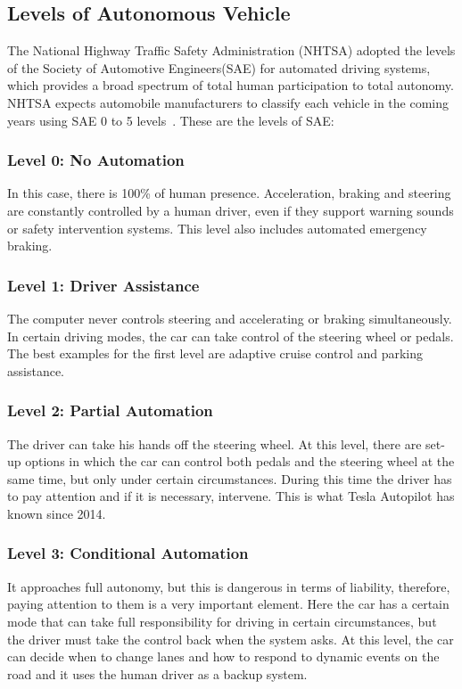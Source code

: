 \subsection{Levels of Autonomous Vehicle~\cite{schoettle2015motorists}}

The  National  Highway  Traffic  Safety Administration  (NHTSA) adopted  the levels of  the Society  of Automotive Engineers(SAE)  for  automated  driving  systems,  which  provides  a  broad  spectrum  of  total  human  participation  to  total autonomy. NHTSA expects automobile manufacturers to classify each vehicle in the coming years using SAE 0 to 5 levels~\cite{blain2017self}. These are the levels of SAE: 

\subsubsection{Level 0: No Automation}
In this case, there is 100\% of human presence. Acceleration, braking  and steering  are constantly  controlled by  a human driver,  even  if  they  support  warning  sounds  or  safety intervention  systems.  This  level  also  includes  automated emergency braking. 

\subsubsection{Level 1: Driver Assistance} 
The  computer  never  controls  steering  and  accelerating  or braking simultaneously. In certain driving modes, the car can take  control  of  the  steering  wheel  or  pedals.  The  best examples  for the  first level are  adaptive cruise  control and parking assistance. 

\subsubsection{Level 2: Partial Automation} 
The driver can take his hands off the steering wheel. At this level, there are set-up options in which the car can control both pedals and the steering wheel at the same time, but only under certain circumstances. During this time the driver has to pay attention and if it is necessary, intervene. This is what Tesla Autopilot has known since 2014. 

\subsubsection{Level 3: Conditional Automation}
It approaches full autonomy, but this is dangerous in terms of liability, therefore, paying attention to them is a very  important  element.  Here  the  car  has  a  certain  mode  that  can  take  full  responsibility  for  driving  in  certain circumstances, but the driver must take the control back when the system asks. At this level, the car can decide when to change lanes and how to respond to dynamic events on the road and it uses the human driver as a backup system. 

